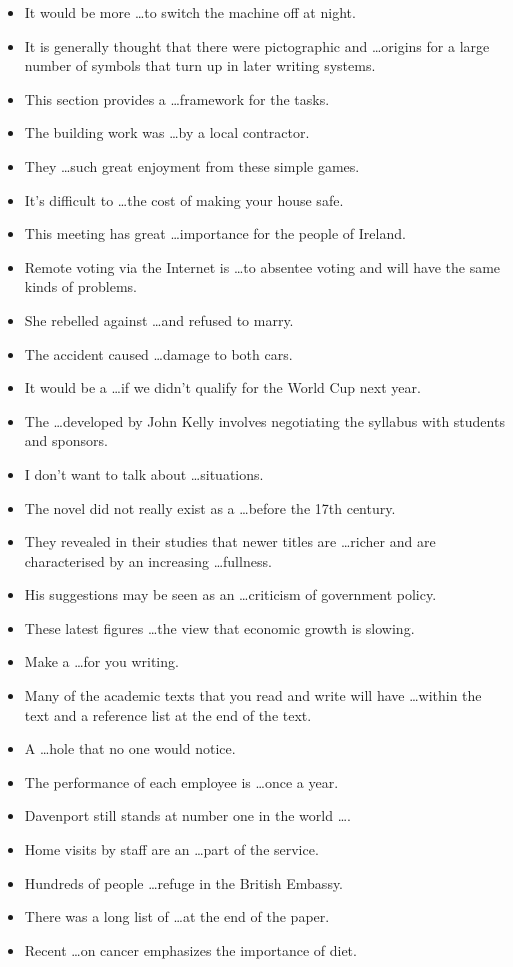 \documentclass[a4paper,10pt]{article}
\theoremstyle{discussion_style} \newtheorem{discussion}{\color{red}{Discussion point}}
\theoremstyle{theorem_style} \newtheorem{theorem}{Theorem}
\begin{document}
\begin{itemize}
\item It would be more \ldots to switch the machine off at night.
\item It is generally thought that there were pictographic and \ldots origins for a large number of symbols that turn up in later writing systems.
\item This section provides a \ldots framework for the tasks.
 \item The building work was \ldots by a local contractor.
\item They \ldots such great enjoyment from these simple games.
\item It's difficult to \ldots the cost of making your house safe.
\item This meeting has great \ldots importance for the people of Ireland. 
 \item Remote voting via the Internet is \ldots to absentee voting and will have the same kinds of problems.
\item She rebelled against \ldots and refused to marry.
\item The accident caused \ldots damage to both cars.
\item It would be a \ldots if we didn't qualify for the World Cup next year.
\item The \ldots developed by John Kelly involves negotiating the syllabus with students and sponsors.
\item I don't want to talk about \ldots situations.
\item The novel did not really exist as a \ldots before the 17th century.
\item They revealed in their studies that newer titles are \ldots richer and are characterised by an increasing \ldots fullness.
\item His suggestions may be seen as an \ldots criticism of government policy.
\item These latest figures \ldots the view that economic growth is slowing.
\item Make a \ldots for you writing.
\item Many of the academic texts that you read and write will have \ldots within the text and a reference list at the end of the text.
\item A \ldots hole that no one would notice.
\item The performance of each employee is \ldots once a year.
\item Davenport still stands at number one in the world \ldots.
\item Home visits by staff are an \ldots part of the service.
\item Hundreds of people \ldots refuge in the British Embassy.
\item There was a long list of \ldots at the end of the paper.
\item Recent \ldots on cancer emphasizes the importance of diet.
\end{itemize}
\end{document}
